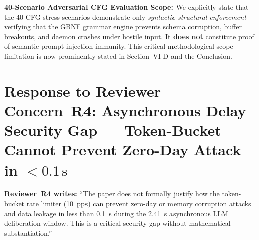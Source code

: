 \documentclass[10pt,letterpaper]{article}
\begin{document}
\begin{authorbox}
\textbf{40-Scenario Adversarial CFG Evaluation Scope:}
We explicitly state that the 40 CFG-stress scenarios demonstrate only
\emph{syntactic structural enforcement}---verifying that the GBNF grammar
engine prevents schema corruption, buffer breakouts, and daemon crashes under
hostile input. It \textbf{does not} constitute proof of semantic
prompt-injection immunity. This critical methodological scope limitation is now
prominently stated in Section~VI-D and the Conclusion.
\end{authorbox}

\section{Response to Reviewer Concern~R4: Asynchronous Delay Security Gap ---
Token-Bucket Cannot Prevent Zero-Day Attack in $<0.1\,\mathrm{s}$}

\begin{reviewerbox}
\textbf{Reviewer~R4 writes:} ``The paper does not formally justify how the
token-bucket rate limiter (10~pps) can prevent zero-day or memory corruption
attacks and data leakage in less than 0.1~s during the 2.41~s asynchronous
LLM deliberation window. This is a critical security gap without mathematical
substantiation.''
\end{reviewerbox}
\end{document}
